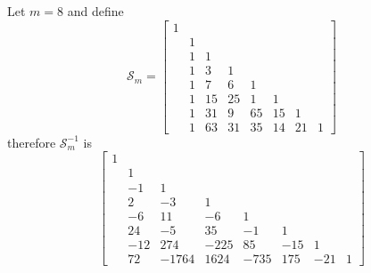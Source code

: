 Let $m=8$ and define
\begin{displaymath}
\mathcal{S}_{m} = \left[\begin{matrix}1 &   &   &   &   &   &   &  \\  & 1 &   &   &   &   &   &  \\  & 1 & 1 &   &   &   &   &  \\  & 1 & 3 & 1 &   &   &   &  \\  & 1 & 7 & 6 & 1 &   &   &  \\  & 1 & 15 & 25 & 1  & 1 &   &  \\  & 1 & 31 & 9  & 65 & 15 & 1 &  \\  & 1 & 63 & 3 1 & 35  & 14  & 21 & 1\end{matrix}\right]
\end{displaymath}
therefore $\mathcal{S}_{m}^{-1}$ is
\begin{displaymath}
\left[\begin{matrix}1 &   &   &   &   &   &   &  \\  & 1 &   &   &   &   &   &  \\  & -1 & 1 &   &   &   &   &  \\  & 2 & -3 & 1 &   &   &   &  \\  & -6 & 11 & -6 & 1 &   &   &  \\  & 24 & -5  & 35 & -1  & 1 &   &  \\  & -12  & 274 & -225 & 85 & -15 & 1 &  \\  & 72  & -1764 & 1624 & -735 & 175 & -21 & 1\end{matrix}\right]
\end{displaymath}
